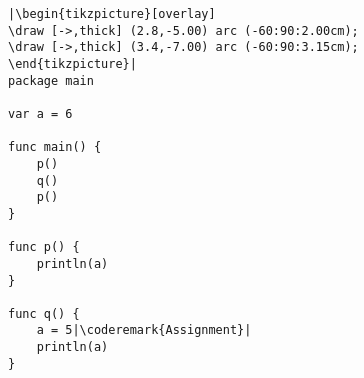 \begin{lstlisting}[caption=Global scope,label=src:scope2]
|\begin{tikzpicture}[overlay]
\draw [->,thick] (2.8,-5.00) arc (-60:90:2.00cm);
\draw [->,thick] (3.4,-7.00) arc (-60:90:3.15cm);
\end{tikzpicture}|
package main

var a = 6

func main() {
    p()
    q()
    p()
}

func p() {
    println(a)
}

func q() {
    a = 5|\coderemark{Assignment}|
    println(a)
}
\end{lstlisting}
